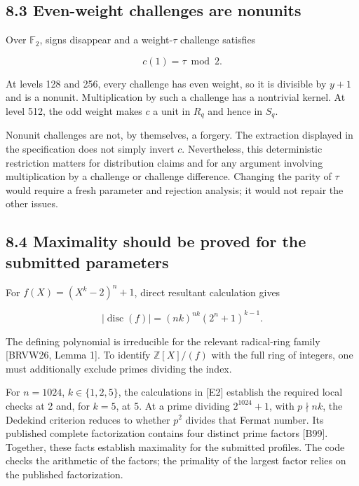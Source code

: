 \documentclass[
  american,
  10pt,
  a4paper,
]{article}
\begin{document}
\subsection{8.3 Even-weight challenges are
nonunits}\label{even-weight-challenges-are-nonunits}

Over \(\mathbb F_2\), signs disappear and a weight-\(\tau\) challenge
satisfies

\[
c(1)=\tau\bmod2.
\]

At levels 128 and 256, every challenge has even weight, so it is
divisible by \(y+1\) and is a nonunit. Multiplication by such a
challenge has a nontrivial kernel. At level 512, the odd weight makes
\(c\) a unit in \(R_q\) and hence in \(S_q\).

Nonunit challenges are not, by themselves, a forgery. The extraction
displayed in the specification does not simply invert \(c\).
Nevertheless, this deterministic restriction matters for distribution
claims and for any argument involving multiplication by a challenge or
challenge difference. Changing the parity of \(\tau\) would require a
fresh parameter and rejection analysis; it would not repair the other
issues.

\subsection{8.4 Maximality should be proved for the submitted
parameters}\label{maximality-should-be-proved-for-the-submitted-parameters}

For \(f(X)=(X^k-2)^n+1\), direct resultant calculation gives

\[
|\operatorname{disc}(f)|=(nk)^{nk}(2^n+1)^{k-1}.
\]

The defining polynomial is irreducible for the relevant radical-ring
family {[}BRVW26, Lemma 1{]}. To identify \(\mathbb Z[X]/(f)\) with the
full ring of integers, one must additionally exclude primes dividing the
index.

For \(n=1024\), \(k\in\{1,2,5\}\), the calculations in {[}E2{]}
establish the required local checks at 2 and, for \(k=5\), at 5. At a
prime dividing \(2^{1024}+1\), with \(p\nmid nk\), the Dedekind
criterion reduces to whether \(p^2\) divides that Fermat number. Its
published complete factorization contains four distinct prime factors
{[}B99{]}. Together, these facts establish maximality for the submitted
profiles. The code checks the arithmetic of the factors; the primality
of the largest factor relies on the published factorization.
\end{document}

